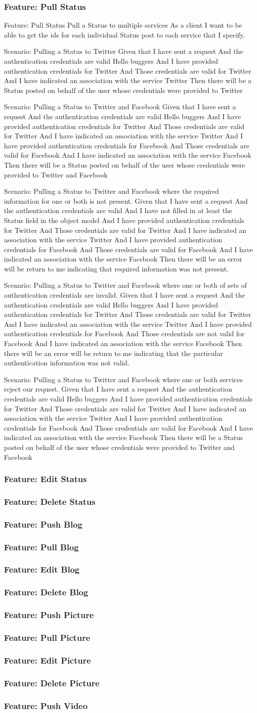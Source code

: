 \documentclass[12pt]{article}
\newcommand{\CoreTestCases}[5]{
Feature: #1 #2
	#1 a #2 to multiple services
	As a client
	I want to be able to get the ids for each individual #2 post to each 
	service that I specify.
	
Scenario: #1ing a #2 to #3
	Given that I have sent a request
	And the authentication credentials are valid
	#5
	And I have provided authentication credentials for #3
	And Those credentials are valid for #3
	And I have indicated an association with the service #3
	Then there will be a #2 posted on behalf of the user whose credentials 
	were provided to #3

Scenario: #1ing a #2 to #3 and #4
	Given that I have sent a request
	And the authentication credentials are valid
	#5
	And I have provided authentication credentials for #3
	And Those credentials are valid for #3
	And I have indicated an association with the service #3
	And I have provided authentication credentials for #4
	And Those credentials are valid for #4
	And I have indicated an association with the service #4
	Then there will be a #2 posted on behalf of the user whose credentials 
	were provided to #3 and #4

Scenario: #1ing a #2 to #3 and #4 where the required 
information for one or both is not present.
	Given that I have sent a request
	And the authentication credentials are valid
	And I have not filled in at least the #2 field in the object model
	And I have provided authentication credentials for #3
	And Those credentials are valid for #3
	And I have indicated an association with the service #3
	And I have provided authentication credentials for #4
	And Those credentials are valid for #4
	And I have indicated an association with the service #4
	Then there will be an error will be return to me indicating that required 
	information was not present.

Scenario: #1ing a #2 to #3 and #4 where one or both of sets of 
authentication credentials are invalid.
	Given that I have sent a request
	And the authentication credentials are valid
	#5
	And I have provided authentication credentials for #3
	And Those credentials are valid for #3
	And I have indicated an association with the service #3
	And I have provided authentication credentials for #4
	And Those credentials are not valid for #4
	And I have indicated an association with the service #4
	Then there will be an error will be return to me indicating that the 
	particular authentication information was not valid. 


Scenario: #1ing a #2 to #3 and #4 where one or both services 
reject our request.
	Given that I have sent a request
	And the authentication credentials are valid
	#5
	And I have provided authentication credentials for #3
	And Those credentials are valid for #3
	And I have indicated an association with the service #3
	And I have provided authentication credentials for #4
	And Those credentials are valid for #4
	And I have indicated an association with the service #4
	Then there will be a #2 posted on behalf of the user whose credentials 
	were provided to #3 and #4

}
\begin{document}
\subsubsection{Feature: Pull Status}
\CoreTestCases{Pull}{Status}{Twitter}{Facebook}{Hello buggers}

\subsubsection{Feature: Edit Status}
\subsubsection{Feature: Delete Status}

\subsubsection{Feature: Push Blog}

\subsubsection{Feature: Pull Blog}
\subsubsection{Feature: Edit Blog}
\subsubsection{Feature: Delete Blog}

\subsubsection{Feature: Push Picture}
\subsubsection{Feature: Pull Picture}
\subsubsection{Feature: Edit Picture}
\subsubsection{Feature: Delete Picture}

\subsubsection{Feature: Push Video}
\end{document}
